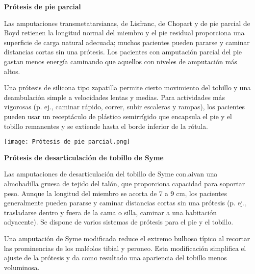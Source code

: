 \documentclass{article}
\begin{document}
\textbf {Prótesis de pie parcial}

Las amputaciones transmetatarsianas, de Lisfranc, de Chopart y de pie parcial de Boyd retienen la longitud normal del miembro y el pie residual proporciona una superficie de carga natural adecuada; muchos pacientes pueden pararse y caminar distancias cortas sin una prótesis. Los pacientes con amputación parcial del pie gastan menos energía caminando que aquellos con niveles de amputación más altos.

Una prótesis de silicona tipo zapatilla permite cierto movimiento del tobillo y una deambulación simple a velocidades lentas y medias. Para actividades más vigorosas (p. ej., caminar rápido, correr, subir escaleras y rampas), los pacientes pueden usar un receptáculo de plástico semirrígido que encapsula el pie y el tobillo remanentes y se extiende hasta el borde inferior de la rótula.


\hspace{1cm} 

\begin{minipage}{.89\linewidth}
\centering
\texttt{[image: Prótesis de pie parcial.png]}
\end{minipage}


\hspace{1cm}

\textbf {Prótesis de desarticulación de tobillo de Syme}

\hspace{1cm} 

Las amputaciones de desarticulación del tobillo de Syme con.aivan una almohadilla gruesa de tejido del talón, que proporciona capacidad para soportar peso. Aunque la longitud del miembro se acorta de 7 a 9 cm, los pacientes generalmente pueden pararse y caminar distancias cortas sin una prótesis (p. ej., trasladarse dentro y fuera de la cama o silla, caminar a una habitación adyacente). Se dispone de varios sistemas de prótesis para el pie y el tobillo.

\hspace{1cm} 


Una amputación de Syme modificada reduce el extremo bulboso típico al recortar las prominencias de los maléolos tibial y peroneo. Esta modificación simplifica el ajuste de la prótesis y da como resultado una apariencia del tobillo menos voluminosa.

\hspace{1cm} 

\hspace{1cm} 
\end{document}

